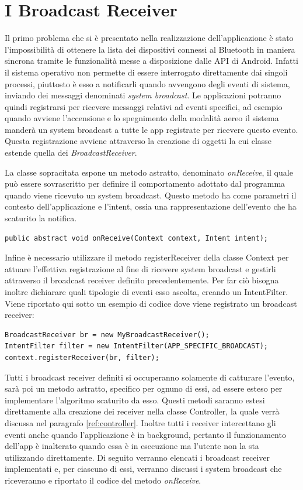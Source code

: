 \section{I Broadcast Receiver}
Il primo problema che si è presentato nella realizzazione dell'applicazione è stato l'impossibilità di ottenere la lista dei dispositivi connessi al Bluetooth in maniera sincrona tramite le funzionalità messe a disposizione dalle API di Android. Infatti il sistema operativo non permette di essere interrogato direttamente dai singoli processi, piuttosto è esso a notificarli quando avvengono degli eventi di sistema, inviando dei messaggi denominati \textit{system broadcast}. Le applicazioni potranno quindi registrarsi per ricevere messaggi relativi ad eventi specifici, ad esempio quando avviene l'accensione e lo spegnimento della modalità aereo il sistema manderà un system broadcast a tutte le app registrate per ricevere questo evento. Questa registrazione avviene attraverso la creazione di oggetti la cui classe estende quella dei \textit{BroadcastReceiver}.\cite{ref:android-broadcast}

La classe sopracitata espone un metodo astratto, denominato \textit{onReceive}, il quale può essere sovrascritto per definire il comportamento adottato dal programma quando viene ricevuto un system broadcast. Questo metodo ha come parametri il contesto dell'applicazione e l'intent, ossia una rappresentazione dell'evento che ha scaturito la notifica.

\begin{verbatim}
public abstract void onReceive(Context context, Intent intent);
\end{verbatim}

Infine è necessario utilizzare il metodo registerReceiver della classe Context per attuare l'effettiva registrazione al fine di ricevere system broadcast e gestirli attraverso il broadcast receiver definito precedentemente. Per far ciò bisogna inoltre dichiarare quali tipologie di eventi esso ascolta, creando un IntentFilter. Viene riportato qui sotto un esempio di codice dove viene registrato un broadcast receiver:
\begin{verbatim}
BroadcastReceiver br = new MyBroadcastReceiver();
IntentFilter filter = new IntentFilter(APP_SPECIFIC_BROADCAST);
context.registerReceiver(br, filter);
\end{verbatim}

Tutti i broadcast receiver definiti si occuperanno solamente di catturare l'evento, sarà poi un metodo astratto, specifico per ognuno di essi, ad essere esteso per implementare l'algoritmo scaturito da esso. Questi metodi saranno estesi direttamente alla creazione dei receiver nella classe Controller, la quale verrà discussa nel paragrafo \ref{ref:controller}. Inoltre tutti i receiver intercettano gli eventi anche quando l'applicazione è in background, pertanto il funzionamento dell'app è inalterato quando essa è in esecuzione ma l'utente non la sta utilizzando direttamente. Di seguito verranno elencati i broadcast receiver implementati e, per ciascuno di essi, verranno discussi i system broadcast che riceveranno e riportato il codice del metodo \textit{onReceive}.

